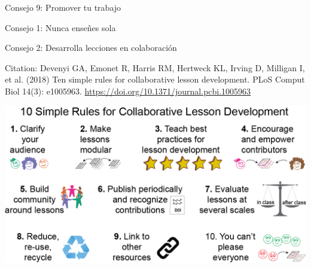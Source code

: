\begin{frame}{Consejo 9: Promover tu trabajo}

\end{frame}

\begin{frame}{Consejo 1: Nunca enseñes sola}

\end{frame}

\begin{frame}{Consejo 2: Desarrolla lecciones en colaboración}

Citation: Devenyi GA, Emonet R, Harris RM, Hertweck KL, Irving D,
Milligan I, et al. (2018) Ten simple rules for collaborative lesson
development. PLoS Comput Biol 14(3): e1005963.
\url{https://doi.org/10.1371/journal.pcbi.1005963}

\includegraphics{../figures/talk/plos.png}

\end{frame}
